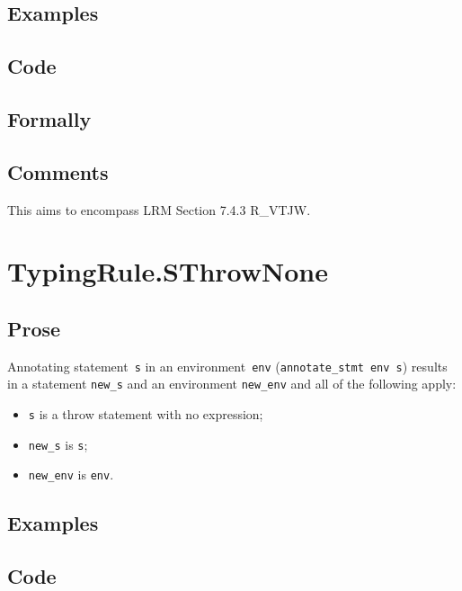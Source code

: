 \documentclass{book}
\begin{document}
  \subsection{Examples}

  \subsection{Code}

  \subsection{Formally}

  \subsection{Comments}
    This aims to encompass LRM Section 7.4.3 R\_VTJW.
 

\section{TypingRule.SThrowNone \label{sec:TypingRule.SThrowNone}}

  \subsection{Prose}
Annotating statement~\texttt{s} in an environment~\texttt{env}
(\texttt{annotate\_stmt env s}) results in a statement \texttt{new\_s} and an
environment \texttt{new\_env} and all of the following apply:
   \begin{itemize}
   \item \texttt{s} is a throw statement with no expression;
   \item \texttt{new\_s} is \texttt{s};
   \item \texttt{new\_env} is \texttt{env}.
   \end{itemize}

  \subsection{Examples}

  \subsection{Code}
\end{document}
